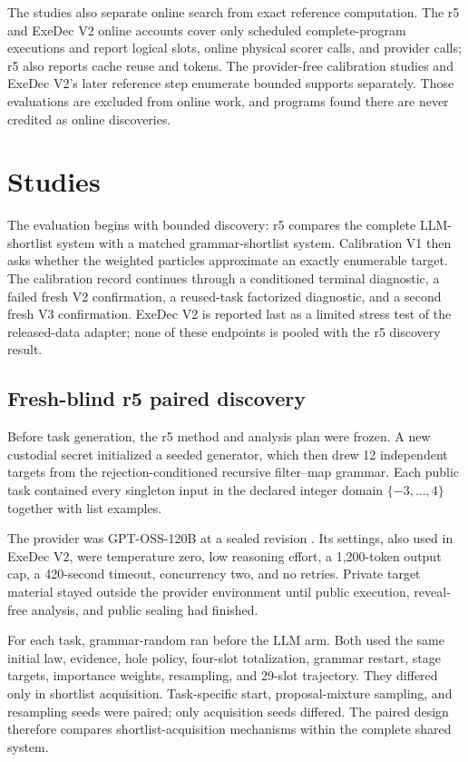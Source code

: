 \documentclass[twoside,11pt]{article}
\begin{document}
The studies also separate online search from exact reference computation. The
r5 and ExeDec V2 online
accounts cover only scheduled complete-program executions and report logical
slots, online physical scorer calls, and provider calls; r5 also reports cache
reuse and tokens. The provider-free calibration studies and ExeDec V2's later
reference step enumerate bounded supports separately. Those evaluations are
excluded from online work, and programs found there are never credited as
online discoveries.

\section{Studies}
\label{sec:studies}

The evaluation begins with bounded discovery: r5 compares the complete
LLM-shortlist system with a matched grammar-shortlist system. Calibration V1
then asks whether the weighted particles approximate an exactly enumerable
target. The calibration record continues through a conditioned terminal
diagnostic, a failed fresh V2 confirmation, a reused-task factorized diagnostic,
and a second fresh V3 confirmation. ExeDec V2 is reported last as a limited
stress test of the released-data adapter; none of these endpoints is pooled with
the r5 discovery result.

\subsection{Fresh-blind r5 paired discovery}

Before task generation, the r5 method and analysis plan were frozen. A new
custodial secret initialized a seeded generator, which then drew 12 independent
targets from the rejection-conditioned recursive filter--map grammar. Each
public task contained every singleton input in the declared integer domain
$\{-3,\ldots,4\}$ together with list examples.

The provider was GPT-OSS-120B at a sealed revision
\citep{openai2025gptoss}. Its settings, also used in ExeDec V2, were temperature
zero, low reasoning effort, a 1,200-token output cap, a 420-second timeout,
concurrency two, and no retries. Private target material stayed outside the
provider environment until public execution, reveal-free analysis, and public
sealing had finished.

For each task, grammar-random ran before the LLM arm. Both used the same initial
law, evidence, hole policy, four-slot totalization, grammar restart, stage
targets, importance weights, resampling, and 29-slot trajectory. They differed
only in shortlist acquisition. Task-specific start, proposal-mixture sampling,
and resampling seeds were paired; only acquisition seeds differed. The paired
design therefore compares shortlist-acquisition mechanisms within the complete
shared system.
\end{document}
